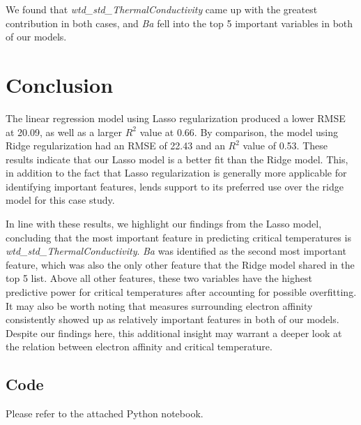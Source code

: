 \documentclass[twoside,twocolumn]{article}
\begin{document}
We found that \emph{wtd\_std\_ThermalConductivity} came up with the greatest contribution in both cases, and \emph{Ba} fell into the top 5 important variables in both of our models. 


\section{Conclusion}

The linear regression model using Lasso regularization produced a lower RMSE at 20.09, as well as a larger $R^{2}$ value at 0.66. By comparison, the model using Ridge regularization had an RMSE of 22.43 and an $R^{2}$ value of 0.53. These results indicate that our Lasso model is a better fit than the Ridge model. This, in addition to the fact that Lasso regularization is generally more applicable for identifying important features, lends support to its preferred use over the ridge model for this case study. 

In line with these results, we highlight our findings from the Lasso model, concluding that the most important feature in predicting critical temperatures is \emph{wtd\_std\_ThermalConductivity}. \emph{Ba} was identified as the second most important feature, which was also the only other feature that the Ridge model shared in the top 5 list. Above all other features, these two variables have the highest predictive power for critical temperatures after accounting for possible overfitting. It may also be worth noting that measures surrounding electron affinity consistently showed up as relatively important features in both of our models. Despite our findings here, this additional insight may warrant a deeper look at the relation between electron affinity and critical temperature.  



\subsection{Code}
Please refer to the attached Python notebook.


\end{document}
